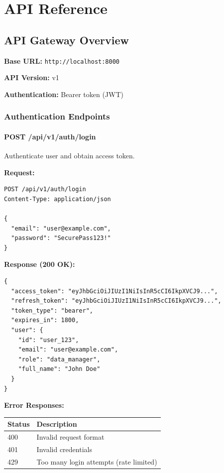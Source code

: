 
\chapter{API Reference}

\section{API Gateway Overview}

\textbf{Base URL:} \texttt{http://localhost:8000}

\textbf{API Version:} v1

\textbf{Authentication:} Bearer token (JWT)

\subsection{Authentication Endpoints}

\subsubsection{POST /api/v1/auth/login}

Authenticate user and obtain access token.

\textbf{Request:}
\begin{lstlisting}[style=pythonstyle]
POST /api/v1/auth/login
Content-Type: application/json

{
  "email": "user@example.com",
  "password": "SecurePass123!"
}
\end{lstlisting}

\textbf{Response (200 OK):}
\begin{lstlisting}[style=pythonstyle]
{
  "access_token": "eyJhbGciOiJIUzI1NiIsInR5cCI6IkpXVCJ9...",
  "refresh_token": "eyJhbGciOiJIUzI1NiIsInR5cCI6IkpXVCJ9...",
  "token_type": "bearer",
  "expires_in": 1800,
  "user": {
    "id": "user_123",
    "email": "user@example.com",
    "role": "data_manager",
    "full_name": "John Doe"
  }
}
\end{lstlisting}

\textbf{Error Responses:}
\begin{table}[h]
\centering
\begin{tabularx}{\textwidth}{lX}
\toprule
\textbf{Status} & \textbf{Description} \\
\midrule
400 & Invalid request format \\
401 & Invalid credentials \\
429 & Too many login attempts (rate limited) \\
\bottomrule
\end{tabularx}
\end{table}

